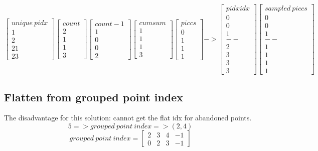 \documentclass[,table,dvipsnames]{article}
\begin{document}
\[
\begin{bmatrix}
unique\ pidx \\  1\\ 2\\21 \\23
\end{bmatrix}
\begin{bmatrix}
count \\ 2\\1\\1\\3
\end{bmatrix}
\begin{bmatrix}
count-1 \\  1\\0\\0\\2
\end{bmatrix}
\begin{bmatrix}
cumsum \\  1\\1\\1\\3
\end{bmatrix}
\begin{bmatrix}
piccs \\  0\\1\\ 1\\1
\end{bmatrix}
->
\begin{bmatrix}
pidxidx\\0\\0\\1\\--\\2\\3\\3\\3
\end{bmatrix}
\begin{bmatrix}
sampled\ piccs\\0\\0\\1\\--\\1\\1\\1\\1
\end{bmatrix}
\]


\subsection{Flatten from grouped point index}
The disadvantage for this solution: cannot get the flat idx for abandoned points.
$$ 5 => grouped\ point\ index => (2,4) $$
\[ grouped\ point\ index =  \begin{bmatrix}
2 & 3 & 4 & -1 \\ 0 & 2 & 3 & -1
\end{bmatrix} \]
\end{document}
